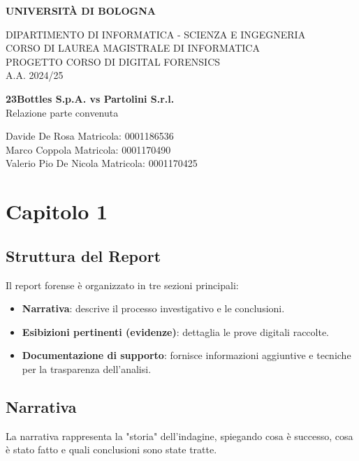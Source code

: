 \documentclass[a4paper,12pt]{report}
\begin{document}
\begin{titlepage}
    \centering
    \vspace*{0.1cm}

    \Huge
    \textbf{UNIVERSITÀ DI BOLOGNA}

    \vspace{1cm}
    \large
    DIPARTIMENTO DI INFORMATICA - SCIENZA E INGEGNERIA \\
    CORSO DI LAUREA MAGISTRALE DI INFORMATICA\\\vspace{1cm}
    PROGETTO CORSO DI DIGITAL FORENSICS\\
    A.A. 2024/25

    \vspace{5cm}
    \textbf{\LARGE 23Bottles S.p.A. vs Partolini S.r.l.}\\
    \Large Relazione parte convenuta

    \vfill

    \vfill

    \Large
    Davide De Rosa \hfill Matricola: 0001186536\\
    Marco Coppola \hfill Matricola: 0001170490\\
    Valerio Pio De Nicola \hfill Matricola: 0001170425\\
\end{titlepage}

\tableofcontents
\newpage

\chapter{Capitolo 1}


\section{Struttura del Report}
Il report forense è organizzato in tre sezioni principali:
\begin{itemize}
    \item \textbf{Narrativa}: descrive il processo investigativo e le conclusioni.
    \item \textbf{Esibizioni pertinenti (evidenze)}: dettaglia le prove digitali raccolte.
    \item \textbf{Documentazione di supporto}: fornisce informazioni aggiuntive e tecniche per la trasparenza dell'analisi.
\end{itemize}

\section{Narrativa}
La narrativa rappresenta la "storia" dell'indagine, spiegando cosa è successo, cosa è stato fatto e quali conclusioni sono state tratte.
\end{document}
